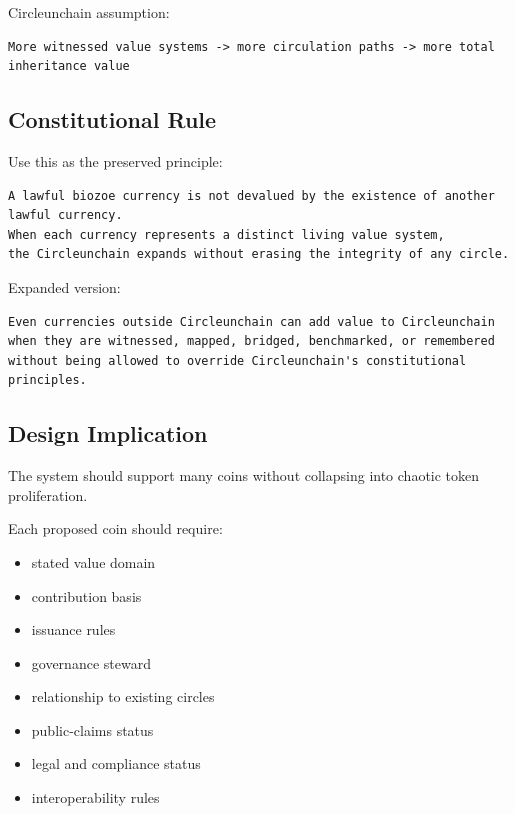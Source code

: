 ﻿\documentclass[12pt]{article}
\begin{document}
Circleunchain assumption:

\begin{verbatim}
More witnessed value systems -> more circulation paths -> more total inheritance value
\end{verbatim}

\subsection{Constitutional Rule}


Use this as the preserved principle:

\begin{verbatim}
A lawful biozoe currency is not devalued by the existence of another lawful currency.
When each currency represents a distinct living value system,
the Circleunchain expands without erasing the integrity of any circle.
\end{verbatim}

Expanded version:

\begin{verbatim}
Even currencies outside Circleunchain can add value to Circleunchain
when they are witnessed, mapped, bridged, benchmarked, or remembered
without being allowed to override Circleunchain's constitutional principles.
\end{verbatim}

\subsection{Design Implication}


The system should support many coins without collapsing into chaotic token proliferation.

Each proposed coin should require:

\begin{itemize}
  \item stated value domain
\end{itemize}
\begin{itemize}
  \item contribution basis
\end{itemize}
\begin{itemize}
  \item issuance rules
\end{itemize}
\begin{itemize}
  \item governance steward
\end{itemize}
\begin{itemize}
  \item relationship to existing circles
\end{itemize}
\begin{itemize}
  \item public-claims status
\end{itemize}
\begin{itemize}
  \item legal and compliance status
\end{itemize}
\begin{itemize}
  \item interoperability rules
\end{itemize}
\end{document}

